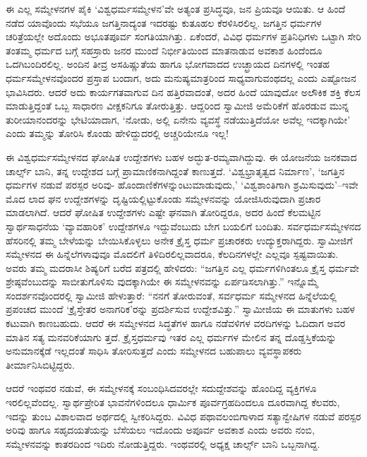 ಈ ಎಲ್ಲ ಸಮ್ಮೇಳನಗಳ ಪೈಕಿ ‘ವಿಶ್ವಧರ್ಮಸಮ್ಮೇಳನ’ವೇ ಅತ್ಯಂತ ಪ್ರಸಿದ್ಧವೂ, ಜನ ಪ್ರಿಯವೂ ಆಯಿತು. ಆ ಹಿಂದೆ ನಡೆದ ಯಾವೊಂದು ಸಭೆಯೂ ಜಗತ್ತಿನಾದ್ಯಂತ ಇದರಷ್ಟು ಕುತೂಹಲ ಕೆರಳಿಸಿರಲಿಲ್ಲ. ಜಗತ್ತಿನ ಧರ್ಮಗಳ ಚರಿತ್ರೆಯಲ್ಲೇ ಅದೊಂದು ಅಭೂತಪೂರ್ವ ಸಂಗತಿಯಾಗಿತ್ತು. ಏಕೆಂದರೆ, ವಿವಿಧ ಧರ್ಮಗಳ ಪ್ರತಿನಿಧಿಗಳು ಒಟ್ಟಾಗಿ ಸೇರಿ ತಂತಮ್ಮ ಧರ್ಮದ ಬಗ್ಗೆ ಸಹಸ್ರಾರು ಜನರ ಮುಂದೆ ನಿರ್ಭೀತಿಯಿಂದ ಮಾತನಾಡುವ ಅವಕಾಶ ಹಿಂದೆಂದೂ ಒದಗಿಬಂದಿರಲಿಲ್ಲ. ಅಂದಿನ ತೀವ್ರ ಅಸಹಿಷ್ಣುತೆಯ ಹಾಗೂ ಭೋಗವಾದದ ಉಚ್ಛ್ರಾಯದ ದಿನಗಳಲ್ಲಿ ಇಂತಹ ಧರ್ಮಸಮ್ಮೇಳನವೊಂದರ ಪ್ರಸ್ತಾಪ ಬಂದಾಗ, ಅದು ಮನುಷ್ಯಮಾತ್ರರಿಂದ ಸಾಧ್ಯವಾಗುವಂಥದಲ್ಲ ಎಂದು ಎಷ್ಟೋಜನ ಭಾವಿಸಿದರು. ಆದರೆ ಅದು ಕಾರ್ಯಗತವಾಗುವ ದಿನ ಹತ್ತಿರವಾದಂತೆ, ಅದರ ಹಿಂದೆ ಯಾವುದೋ ಅಲೌಕಿಕ ಶಕ್ತಿ ಕೆಲಸ ಮಾಡುತ್ತಿದ್ದಂತೆ ಒಬ್ಬ ಸಾಧಾರಣ ವೀಕ್ಷಕನಿಗೂ ತೋರುತ್ತಿತ್ತು. ಆದ್ದರಿಂದ ಸ್ವಾಮೀಜಿ ಅಮೆರಿಕೆಗೆ ಹೊರಡುವ ಮುನ್ನ ತುರೀಯಾನಂದರನ್ನು ಭೇಟಿಯಾದಾಗ, ‘ನೋಡು, ಅಲ್ಲಿ ಏನೇನು ವ್ಯವಸ್ಥೆ ನಡೆಯುತ್ತಿದೆಯೋ ಅವೆಲ್ಲ ಇದಕ್ಕಾಗಿಯೇ’ ಎಂದು ತಮ್ಮನ್ನು ತೋರಿಸಿ ಕೊಂಡು ಹೇಳಿದ್ದುದರಲ್ಲಿ ಅಚ್ಚರಿಯೇನೂ ಇಲ್ಲ!

ಈ ವಿಶ್ವಧರ್ಮಸಮ್ಮೇಳನದ ಘೋಷಿತ ಉದ್ದೇಶಗಳು ಬಹಳ ಅದ್ಭುತ-ರಮ್ಯವಾಗಿದ್ದುವು. ಈ ಯೋಜನೆಯ ಜನಕವಾದ ಚಾರ್ಲ್ಸ್ ಬಾನಿ, ತನ್ನ ಉದ್ದೇಶದ ಬಗ್ಗೆ ಪ್ರಾಮಾಣಿಕನಾಗಿದ್ದಂತೆ ಕಾಣುತ್ತದೆ. ‘ವಿಶ್ವಭ್ರಾತೃತ್ವದ ನಿರ್ಮಾಣ’, ‘ಜಗತ್ತಿನ ಧರ್ಮಗಳ ನಡುವೆ ಪರಸ್ಪರ ಅರಿವು- ಹೊಂದಾಣಿಕೆಗಳನ್ನುಂಟುಮಾಡುವುದು,’ ‘ವಿಶ್ವಶಾಂತಿಗಾಗಿ ಶ್ರಮಿಸುವುದು’–ಇವೇ ಮೊದ ಲಾದ ಘನ ಉದ್ದೇಶಗಳನ್ನು ದೃಷ್ಟಿಯಲ್ಲಿಟ್ಟುಕೊಂಡು ಸಮ್ಮೇಳನವನ್ನು ಯೋಜಿಸಿರುವುದಾಗಿ ಪ್ರಚಾರ ಮಾಡಲಾಗಿದೆ. ಆದರೆ ಘೋಷಿತ ಉದ್ದೇಶಗಳು ಎಷ್ಟೇ ಘನವಾಗಿ ತೋರಿದ್ದರೂ, ಅದರ ಹಿಂದೆ ಕೆಲಮಟ್ಟಿನ ಸ್ವಾರ್ಥಸಾಧನೆಯ ‘ವ್ಯಾವಹಾರಿಕ’ ಉದ್ದೇಶಗಳೂ ಇದ್ದುವೆಂಬುದು ಬೇಗ ಬಯಲಿಗೆ ಬಂದಿತು. ಸರ್ವಧರ್ಮಸಮ್ಮೇಳನದ ಹೆಸರಿನಲ್ಲಿ ತಮ್ಮ ಬೇಳೆಯನ್ನು ಬೇಯಿಸಿಕೊಳ್ಳಲು ಅನೇಕ ಕ್ರೈಸ್ತ ಧರ್ಮ ಪ್ರಚಾರಕರು ಉದ್ಯುಕ್ತರಾಗಿದ್ದರು. ಸ್ವಾಮೀಜಿಗೆ ಸಮ್ಮೇಳನದ ಈ ಹಿನ್ನೆಲೆಗಳಾವುವೂ ಮೊದಲಿಗೆ ತಿಳಿದಿರಲಿಲ್ಲವಾದರೂ, ಕೆಲದಿನಗಳಲ್ಲೇ ಎಲ್ಲವೂ ಸ್ಪಷ್ಟವಾಯಿತು. ಅವರು ತಮ್ಮ ಮದರಾಸೀ ಶಿಷ್ಯರಿಗೆ ಬರೆದ ಪತ್ರದಲ್ಲಿ ಹೇಳಿದರು: “ಜಗತ್ತಿನ ಎಲ್ಲ ಧರ್ಮಗಳಿಗಿಂತಲೂ ಕ್ರೈಸ್ತ ಧರ್ಮವೇ ಶ್ರೇಷ್ಠವೆಂಬುದನ್ನು ಸಾಬೀತುಗೊಳಿಸು ವುದಕ್ಕಾಗಿಯೇ ಈ ಸಮ್ಮೇಳನವನ್ನು ಏರ್ಪಡಿಸಲಾಗಿತ್ತು.” ಇನ್ನೊಮ್ಮೆ ಸಂದರ್ಶನವೊಂದರಲ್ಲಿ ಸ್ವಾಮೀಜಿ ಹೇಳುತ್ತಾರೆ: “ನನಗೆ ತೋರುವಂತೆ, ಸರ್ವಧರ್ಮ ಸಮ್ಮೇಳನದ ಹಿನ್ನೆಲೆಯಲ್ಲಿ ಪ್ರಪಂಚದ ಮುಂದೆ ‘ಕ್ರೈಸ್ತೇತರ ಅನಾಗರಿಕ’ರನ್ನು ಪ್ರದರ್ಶಿಸುವ ಉದ್ದೇಶವಿತ್ತು.” ಸ್ವಾಮೀಜಿಯ ಈ ಮಾತುಗಳು ಬಹಳ ಕಟುವಾಗಿ ಕಾಣಬಹುದು. ಆದರೆ ಈ ಸಮ್ಮೇಳನದ ಸಿದ್ಧತೆಗಳ ಹಾಗೂ ನಡೆವಳಿಗಳ ವರದಿಗಳನ್ನು ಓದಿದಾಗ ಅವರ ಮಾತಿನ ಸತ್ಯ ಮನವರಿಕೆಯಾಗು ತ್ತದೆ. ಕ್ರೈಸ್ತಧರ್ಮವು ಇತರ ಎಲ್ಲ ಧರ್ಮಗಳ ಮೇಲಿನ ತನ್ನ ದೊಡ್ಡಸ್ತಿಕೆಯನ್ನು ಅನುಮಾನಕ್ಕೆಡೆ ಇಲ್ಲದಂತೆ ಸಾಧಿಸಿ ತೋರಿಸುತ್ತದೆ ಎಂದು ಸಮ್ಮೇಳನದ ಬಹುಪಾಲು ವ್ಯವಸ್ಥಾಪಕರು ತೀರ್ಮಾನಿಸಿಬಿಟ್ಟಿದ್ದರು.

ಆದರೆ ಇಂಥವರ ನಡುವೆ, ಈ ಸಮ್ಮೇಳನಕ್ಕೆ ಸಂಬಂಧಿಸಿದವರಲ್ಲೇ ಸದುದ್ದೇಶವನ್ನು ಹೊಂದಿದ್ದ ವ್ಯಕ್ತಿಗಳೂ ಇರಲಿಲ್ಲವೆಂದಲ್ಲ. ಸ್ವಾರ್ಥಪ್ರೇರಿತ ಭಾವನೆಗಳಿಂದಲೂ ಧಾರ್ಮಿಕ ಪೂರ್ವಗ್ರಹದಿಂದಲೂ ದೂರವಾಗಿದ್ದ ಕೆಲವರು, ಇದನ್ನು ತುಂಬ ವಿಶಾಲವಾದ ಅರ್ಥದಲ್ಲಿ ಸ್ವೀಕರಿಸಿದ್ದರು. ವಿವಿಧ ಪಥಾವಲಂಬಿಗಾಳಾದ ಸತ್ಯಾನ್ವೇಷಿಗಳ ನಡುವೆ ಪರಸ್ಪರ ಅರಿವು ಹಾಗೂ ಸಹೃದಯತೆಯನ್ನು ಬೆಸೆಯಲು ಇದೊಂದು ಅಪೂರ್ವ ಅವಕಾಶ ಎಂದು ಅವರು ನಂಬಿ, ಸಮ್ಮೇಳನವನ್ನು ಕಾತರದಿಂದ ಇದಿರು ನೋಡುತ್ತಿದ್ದರು. ಇಂಥವರಲ್ಲಿ ಅಧ್ಯಕ್ಷ ಚಾರ್ಲ್ಸ್ ಬಾನಿ ಒಬ್ಬನಾಗಿದ್ದ.

